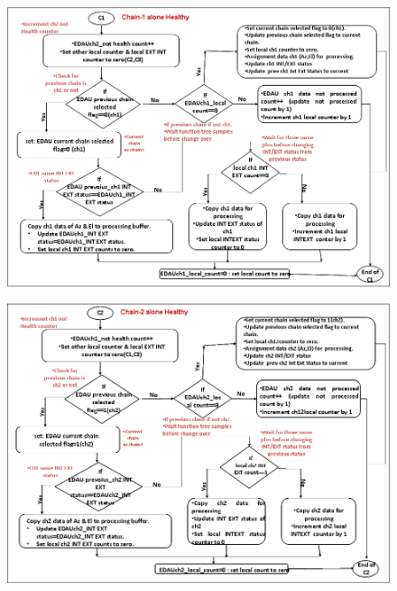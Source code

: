 \begin{figure}[H]
	\centering
	\includegraphics[width=\linewidth]{./FlowCharts/PngFlowCharts/EDAU6.png}
\end{figure}


\begin{figure}[H]
	\centering
	\includegraphics[width=\linewidth]{./FlowCharts/PngFlowCharts/EDAU7.png}
\end{figure}


